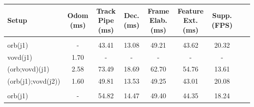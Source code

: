 




\begin{table}[hbt]
	\begin{tabularx}{\linewidth}{@{}l*{7}{C}c@{}}
		\toprule
		\hline
		Setup              & Odom (ms) & Track Pipe (ms) & Dec. (ms) & Frame Elab. (ms) & Feature Ext.(ms) & Supp. (FPS) \\
		\hline
		                                                                                                                                           \\
		\hline
		orb(j1)            & -             & 43.41          & 13.08             & 49.21                 & 43.62                  & 20.32           \\ \hline
		vovd(j1)           & 1.70          & -              & -                 & -                     & -                      & -               \\ \hline
		(orb;vovd)(j1)     & 2.58          & 73.49          & 18.69             & 62.70                 & 54.76                  & 13.61           \\ \hline
		(orb(j1);vovd(j2)) & 1.60          & 49.81          & 13.53             & 49.25                 & 43.01                  & 20.08           \\ \hline
		                                                                                                                                           \\
		\hline
		orb(j1)            & -             & 54.82          & 14.47             & 49.40                 & 44.35                  & 18.24           \\ \hline

\end{tabularx}
\end{table}
